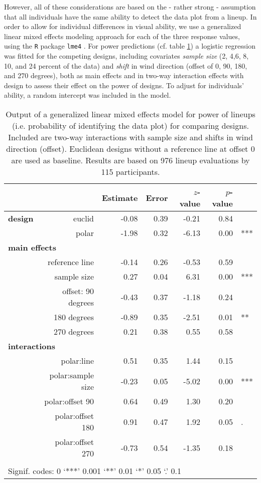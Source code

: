However, all of these considerations are based on the - rather strong - assumption that all individuals have the same ability to detect the data plot from a lineup. In order to allow for individual differences in visual ability, 
 we use a generalized linear mixed effects modeling  approach \cite{pinheiro:2000} for each of the three response values, using the {\tt R} package {\tt lme4} \cite{bates:2011}. 
For power predictions (cf. table \ref{tbl:correct}) a logistic regression was fitted for the competing designs, including covariates {\it sample size} (2, 4,6, 8, 10, and 24 percent of the data) and {\it shift} in wind direction (offset of 0, 90, 180, and 270 degrees), both as main effects and in two-way interaction effects with design to assess their effect on the power of designs. To adjust for individuals' ability, a random intercept was included in the model.

\begin{table}[ht]
\begin{center}
\resizebox{\linewidth}{!} {
\begin{tabular}{rrrrrrl}
  \hline
& & Estimate & Error & $z$-value & $p$-value &\\ 
  \hline
\bf design & euclid & -0.08 & 0.39 & -0.21 & 0.84 &\\ 
&polar & -1.98 & 0.32 & -6.13 & 0.00 & ***\\ [3pt]
\multicolumn{2}{l}{\bf main effects} &&&&&\\
& reference line  & -0.14 & 0.26 & -0.53 & 0.59 & \\ [1pt]
&  sample size & 0.27 & 0.04 & 6.31 & 0.00 & ***\\[1pt]
 &offset:  90 degrees& -0.43 & 0.37 & -1.18 & 0.24 &\\ 
  & 180 degrees& -0.89 & 0.35 & -2.51 & 0.01 & **\\ 
  & 270 degrees& 0.21 & 0.38 & 0.55 & 0.58 &\\ [3pt]
\multicolumn{2}{l}{\bf interactions} &&&&&\\
&  polar:line & 0.51 & 0.35 & 1.44 & 0.15 &\\ [1pt]
&    polar:sample size & -0.23 & 0.05 & -5.02 & 0.00 & ***\\[1pt]
&    polar:offset 90 & 0.64 & 0.49 & 1.30 & 0.20 \\ 
&  polar:offset 180 & 0.91 & 0.47 & 1.92 & 0.05 & .\\ 
&    polar:offset 270 & -0.73 & 0.54 & -1.35 & 0.18 &\\
   \hline
\\[-5pt]
   \multicolumn{5}{l}{Signif. codes:  0 `***' 0.001 `**' 0.01 `*' 0.05 `.' 0.1}
\end{tabular}
}
\end{center}
\caption{\label{tbl:correct} Output of a generalized linear mixed effects model for power of lineups (i.e. probability of identifying the data plot) for comparing designs. Included are two-way interactions with sample size and shifts in wind direction (offset). Euclidean designs without a reference line at offset 0 are used as baseline.
 Results are based on  976 lineup evaluations by 115 participants. }
\end{table}

